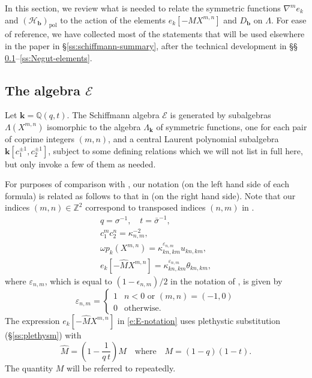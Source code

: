 \documentclass[12pt]{amsart}
\theoremstyle{definition}
\theoremstyle{remark}
\newcommand{\QQ}{{\mathbb Q}}
\newcommand{\ZZ}{{\mathbb Z}}
\newcommand{\kk}{{\mathbf k}}
\newcommand{\bb}{{\mathbf b}}
\newcommand{\Ecal}{{\mathcal E}}
\newcommand{\Hcat}{{\mathcal H}}  %
\DeclareMathOperator{\pol}{pol}
\begin{document}
In this section, we review what is needed to relate the symmetric
functions $\nabla ^{m} e_{k}$ and $(\Hcat _{\bb })_{\pol }$ to the
action of the elements $e_{k}[-MX^{m,n}]$ and $D_{\bb }$ on $\Lambda
$.  For ease of reference, we have collected most of the statements that
will be used elsewhere in the paper in \S \ref{ss:schiffmann-summary},
after the technical development in \S \S
\ref{ss:E}--\ref{ss:Negut-elements}.

\subsection{The algebra \texorpdfstring{$\Ecal $}{E}}
\label{ss:E}

Let $\kk =\QQ (q,t)$.  The Schiffmann algebra $\Ecal $ is generated by
subalgebras $\Lambda (X^{m,n})$ isomorphic to the algebra $\Lambda
_{\kk }$ of symmetric functions, one for each pair of coprime integers
$(m,n)$, and a central Laurent polynomial subalgebra $\kk [c_{1}^{\pm
1}, c_{2}^{\pm 1}]$, subject to some defining relations which we will
not list in full here, but only invoke a few of them as needed.

For purposes of comparison with
\cite{BurbSchi12,Schiffmann12,SchiVass13}, our notation (on the left
hand side of each formula) is related as follows to that in
\cite[Definition 6.4]{BurbSchi12} (on the right hand side).  Note that
our indices $(m,n)\in \ZZ ^{2}$ correspond to transposed indices
$(n,m)$ in \cite{BurbSchi12}.
\begin{equation}\label{e:E-notation}
\begin{gathered}
q = \sigma ^{-1},\quad t = \bar{\sigma }^{-1},\\
c_{1}^{m}c_{2}^{n} = \kappa _{n,m}^{-2},\\
\omega p_{k}(X^{m,n}) = \kappa _{kn,km}^{\varepsilon _{n,m}} u_{kn,km},\\
e_{k}[-\widehat{M} X^{m,n}] = \kappa _{kn,km}^{\varepsilon _{n,m}}
\theta _{kn,km},
\end{gathered}
\end{equation}
where $\varepsilon _{n,m}$, which is equal to $(1-\epsilon _{n,m})/2$
in the notation of \cite{BurbSchi12}, is given by
\begin{equation}\label{e:lower-half-indicator}
\varepsilon _{n,m} = \begin{cases}
1&	\text{$n<0$ or $(m,n)=(-1,0)$}\\
0&	\text{otherwise}.
\end{cases}
\end{equation}
The expression $e_{k}[-\widehat{M} X^{m,n}]$ in \eqref{e:E-notation}
uses plethystic substitution (\S \ref{ss:plethysm}) with
\begin{equation}\label{e:M-hat}
\widehat{M} = (1-\frac{1}{q\, t})M \quad \text{where}\quad M =
(1-q)(1-t).
\end{equation}
The quantity $M$ will be referred to repeatedly.
\end{document}
